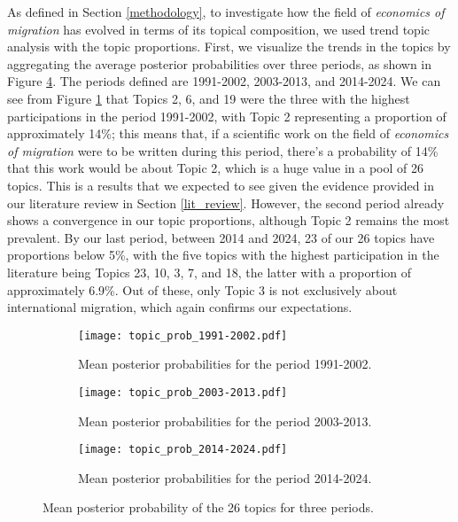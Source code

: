As defined in Section \ref{methodology}, to investigate how the field of \textit{economics of migration} has evolved in terms of its topical composition, we used trend topic analysis with the topic proportions. First, we visualize the trends in the topics by aggregating the average posterior probabilities over three periods, as shown in Figure \ref{fig:topics_posterior}. The periods defined are 1991-2002, 2003-2013, and 2014-2024. We can see from Figure \ref{fig:topics_posterior1991} that Topics 2, 6, and 19 were the three with the highest participations in the period 1991-2002, with Topic 2 representing a proportion of approximately 14\%; this means that, if a scientific work on the field of \textit{economics of migration} were to be written during this period, there's a probability of 14\% that this work would be about Topic 2, which is a huge value in a pool of 26 topics. This is a results that we expected to see given the evidence provided in our literature review in Section \ref{lit_review}. However, the second period already shows a convergence in our topic proportions, although Topic 2 remains the most prevalent. By our last period, between 2014 and 2024, 23 of our 26 topics have proportions below 5\%, with the five topics with the highest participation in the literature being Topics 23, 10, 3, 7, and 18, the latter with a proportion of approximately 6.9\%. Out of these, only Topic 3 is not exclusively about international migration, which again confirms our expectations.

\begin{figure}[ht!]
    \centering 
    \begin{subfigure}[b]{0.49\textwidth}
        \centering
        \texttt{[image: topic\_prob\_1991-2002.pdf]}
        \caption{Mean posterior probabilities for the period 1991-2002.}
        \label{fig:topics_posterior1991}
    \end{subfigure}
    \hfill 
    \begin{subfigure}[b]{0.49\textwidth}
        \centering
        \texttt{[image: topic\_prob\_2003-2013.pdf]}
        \caption{Mean posterior probabilities for the period 2003-2013.}
        \label{fig:topics_posterior2003}
    \end{subfigure}
    \hfill
    \begin{subfigure}[b]{0.49\textwidth}
        \centering
        \texttt{[image: topic\_prob\_2014-2024.pdf]}
        \caption{Mean posterior probabilities for the period 2014-2024.}
        \label{fig:topics_posterior2014}
    \end{subfigure}  
\caption{Mean posterior probability of the 26 topics for three periods.}
\label{fig:topics_posterior}
\end{figure}

